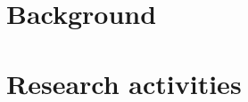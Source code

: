 \documentclass[9pt, aspectratio=169]{beamer}
\begin{document}

\section{Background}
\setcounter{page}{0}



\section{Research activities}






\end{document}
